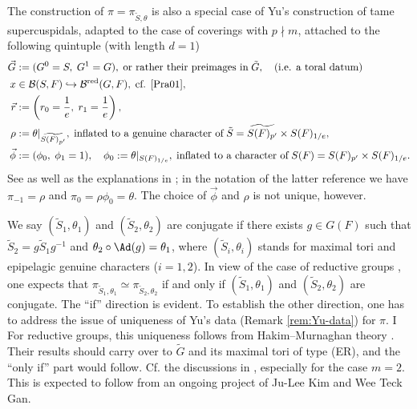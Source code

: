 \documentclass[a4paper,10pt]{article}
\begin{document}
\begin{remark}\label{rem:Yu-data}
	The construction of $\pi = \pi_{\tilde{S}, \theta}$ is also a special case of Yu's construction \cite{Yu01} of tame supercuspidals, adapted to the case of coverings with $p \nmid m$, attached to the following quintuple (with length $d=1$)
	\begin{align*}
		\vec{G} & := (G^0 = S, \; G^1 = G), \; \text{or rather their preimages in}\; \tilde{G}, \quad \text{(i.e. a toral datum)} \\
		x & \in \mathcal{B}(S,F) \hookrightarrow \mathcal{B}^\text{red}(G,F), \;\text{cf. \cite{Pra01}}, \\
		\vec{r} & := \left( r_0 = \frac{1}{e}, \; r_1 = \frac{1}{e} \right), \\
		\rho & := \theta|_{\widetilde{S(F)_{p'}}}, \; \text{inflated to a genuine character of}\; \tilde{S} = \widetilde{S(F)_{p'}} \times S(F)_{1/e}, \\
		\vec{\phi} & := (\phi_0, \; \phi_1 = 1), \quad \phi_0 := \theta|_{S(F)_{1/e}}, \; \text{inflated to a character of}\; S(F) = S(F)_{p'} \times S(F)_{1/e}.
	\end{align*}
	See \cite[\S 3]{Yu01} as well as the explanations in \cite[\S 3.1]{HM08}; in the notation of the latter reference we have $\pi_{-1} = \rho$ and $\pi_0 = \rho\phi_0 = \theta$. The choice of $\vec{\phi}$ and $\rho$ is not unique, however.
\end{remark}

\begin{remark}\label{rem:refactorization}
	We say $(\tilde{S}_1, \theta_1)$ and $(\tilde{S}_2, \theta_2)$ are conjugate if there exists $g \in G(F)$ such that $\tilde{S}_2 = g \tilde{S}_1 g^{-1}$ and $\theta_2 \circ \Ad(g) = \theta_1$, where $(\tilde{S}_i, \theta_i)$ stands for maximal tori and epipelagic genuine characters ($i=1,2$). In view of the case of reductive groups \cite[Fact 3.8]{Kal15}, one expects that $\pi_{\tilde{S}_1, \theta_1} \simeq \pi_{\tilde{S}_2, \theta_2}$ if and only if $(\tilde{S}_1, \theta_1)$ and $(\tilde{S}_2, \theta_2)$ are conjugate. The ``if'' direction is evident. To establish the other direction, one has to address the issue of uniqueness of Yu's data (Remark \ref{rem:Yu-data}) for $\pi$.
	I
	For reductive groups, this uniqueness follows from Hakim--Murnaghan theory \cite[Corollary 6.10]{HM08}. Their results should carry over to $\tilde{G}$ and its maximal tori of type (ER), and the ``only if'' part would follow. Cf. the discussions in \cite[\S 3.5]{LM}, especially for the case $m=2$. This is expected to follow from an ongoing project of Ju-Lee Kim and Wee Teck Gan.
\end{remark}
\end{document}
